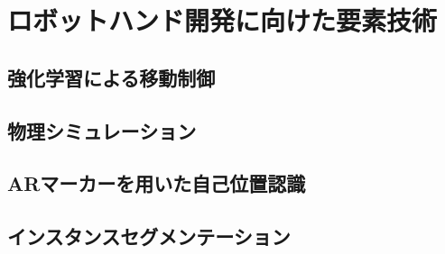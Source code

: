 \chapter{ロボットハンド開発に向けた要素技術}
\label{chap_experiment}


\section{強化学習による移動制御}


\section{物理シミュレーション}


\section{ARマーカーを用いた自己位置認識}


\section{インスタンスセグメンテーション}

